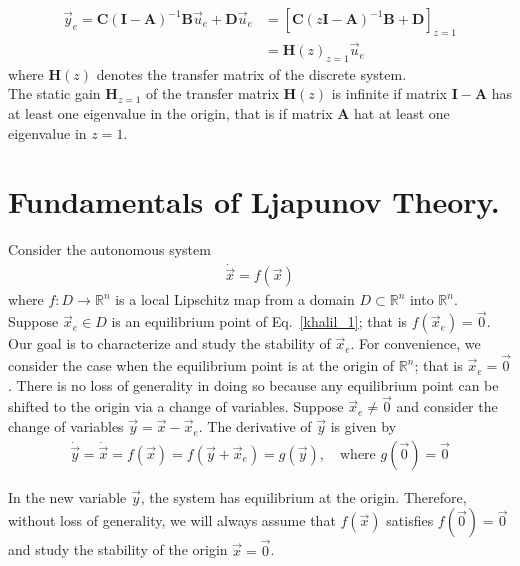 \documentclass[12pt,a4paper,oneside]{book}
\begin{document}
\begin{onehalfspace}
\begin{equation}\label{eq76}
	\begin{aligned}
		\vec{y}_e = \mathbf{C}\left( \mathbf{I} - \mathbf{A}\right)^{-1} 
		\mathbf{B}\vec{u}_e + {\mathbf{D}}\vec{u}_e &= \left[ {\mathbf{C}} 
		\left( z{\mathbf{I}}-{\mathbf{A}}\right)^{-1}{\mathbf{B}}+{\mathbf{D}} 
		\right]_{z=1} \\[8pt]
		&= {\mathbf{H}}(z)_{z=1}\vec{u}_e
	\end{aligned}
\end{equation}
where $\mathbf{H}(z)$ denotes the transfer matrix of the discrete system. \\
The static gain $\mathbf{H}_{z=1}$ of the transfer matrix $\mathbf{H}(z)$ is 
infinite if matrix $\mathbf{I}-\mathbf{A}$ has at least one eigenvalue in the 
origin, that is if matrix $\mathbf{A}$ hat at least one eigenvalue in $z=1$.

\section{Fundamentals of Ljapunov Theory.} 
Consider the autonomous system 
\begin{equation}\label{khalil_1}
	\begin{aligned}
		\dot{\vec{x}}=f(\vec{x})
	\end{aligned}
\end{equation}
where $f:D\rightarrow\mathbb{R}^n$ is a local Lipschitz map from a domain 
$D\subset\mathbb{R}^n$ into $\mathbb{R}^n$. Suppose $\vec{x}_e\in D$ is an 
equilibrium point of Eq.~\eqref{khalil_1}; that is $f(\vec{x}_e)=\vec{0}$. Our 
goal is to characterize and study the stability of $\vec{x}_e$. For 
convenience, we consider the case when the equilibrium point is at the origin 
of $\mathbb{R}^n$; that is $\vec{x}_e=\vec{0}$. There is no loss of generality 
in doing so because any equilibrium point can be shifted to the origin via a 
change of variables. Suppose $\vec{x}_e\ne\vec{0}$ and consider the change of 
variables $\vec{y} = \vec{x}-\vec{x}_e$. The derivative of $\vec{y}$ is given by
\begin{equation}\label{khalil_2}
	\begin{aligned}
		\dot{\vec{y}}= 
		\dot{\vec{x}}=f(\vec{x})=f(\vec{y}+\vec{x}_e)=g(\vec{y}),\quad\text{where
		 } g(\vec{0})=\vec{0}
	\end{aligned}
\end{equation}
\begin{mybox}
	In the new variable $\vec{y}$, the system has equilibrium at the origin. 
	Therefore, without loss of generality, we will always assume that 
	$f(\vec{x})$ satisfies $f(\vec{0})=\vec{0}$ and study the stability of the 
	origin $\vec{x}=\vec{0}$.
\end{mybox}


\end{onehalfspace}
\end{document}
